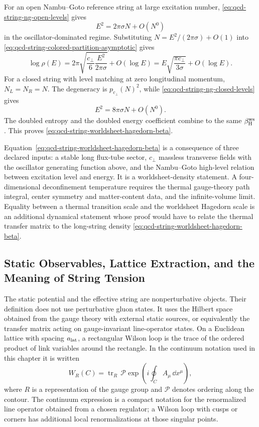 For an open Nambu--Goto reference string at large excitation number,
\eqref{eq:qcd-string-ng-open-levels} gives
\[
  E^2=2\pi\sigma N+O(N^0)
\]
in the oscillator-dominated regime.  Substituting
\(N=E^2/(2\pi\sigma)+O(1)\) into
\eqref{eq:qcd-string-colored-partition-asymptotic} gives
\[
  \log\rho(E)
  =
  2\pi\sqrt{\frac{c_\perp}{6}\frac{E^2}{2\pi\sigma}}
  +O(\log E)
  =
  E\sqrt{\frac{\pi c_\perp}{3\sigma}}+O(\log E).
\]
For a closed string with level matching at zero longitudinal momentum,
\(N_L=N_R=N\).  The degeneracy is \(p_{c_\perp}(N)^2\), while
\eqref{eq:qcd-string-ng-closed-levels} gives
\[
  E^2=8\pi\sigma N+O(N^0).
\]
The doubled entropy and the doubled energy coefficient combine to the same
\(\beta_{\rm H}^{\rm ws}\).  This proves
\eqref{eq:qcd-string-worldsheet-hagedorn-beta}.

\begin{controlledapproximation}
\label{ca:qcd-string-hagedorn-interpretation}
Equation~\eqref{eq:qcd-string-worldsheet-hagedorn-beta} is a consequence of
three declared inputs: a stable long flux-tube sector, \(c_\perp\) massless
transverse fields with the oscillator generating function above, and the
Nambu--Goto high-level relation between excitation level and energy.  It is a
worldsheet-density statement.  A four-dimensional deconfinement temperature
requires the thermal gauge-theory path integral, center symmetry and
matter-content data, and the infinite-volume limit.  Equality between a
thermal transition scale and the worldsheet Hagedorn scale is an additional
dynamical statement whose proof would have to relate the thermal transfer
matrix to the long-string density
\eqref{eq:qcd-string-worldsheet-hagedorn-beta}.
\end{controlledapproximation}

\subsection{Static Observables, Lattice Extraction, and the Meaning of
String Tension}

The static potential and the effective string are nonperturbative objects.
Their definition does not use perturbative gluon states.  It uses the Hilbert
space obtained from the gauge theory with external static sources, or
equivalently the transfer matrix acting on gauge-invariant line-operator
states.  On a Euclidean lattice with spacing \(a_{\rm lat}\), a rectangular
Wilson loop is the trace of the ordered product of link variables around the
rectangle.  In the continuum notation used in this chapter it is written
\[
  W_R(C)=\operatorname{tr}_R\,
  \mathcal P\exp\left(i\oint_C A_\mu\,\dd x^\mu\right),
\]
where \(R\) is a representation of the gauge group and
\(\mathcal P\) denotes ordering along the contour.  The continuum expression
is a compact notation for the renormalized line operator obtained from a
chosen regulator; a Wilson loop with cusps or corners has additional local
renormalizations at those singular points.

